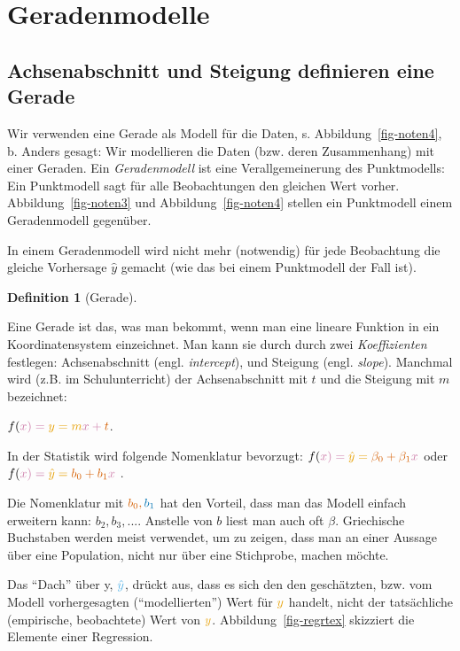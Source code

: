 \documentclass[
  letterpaper,
  twoside,
  open=any]{scrbook}
\theoremstyle{definition}
\newtheorem{definition}{Definition}[chapter]
\theoremstyle{definition}
\theoremstyle{definition}
\theoremstyle{remark}
\begin{document}
\section{Geradenmodelle}\label{geradenmodelle-1}

\subsection{Achsenabschnitt und Steigung definieren eine
Gerade}\label{achsenabschnitt-und-steigung-definieren-eine-gerade}

Wir verwenden eine Gerade als Modell für die Daten, s.
Abbildung~\ref{fig-noten4}, b. Anders gesagt: Wir modellieren die Daten
(bzw. deren Zusammenhang) mit einer Geraden. Ein \emph{Geradenmodell}
ist eine Verallgemeinerung des Punktmodells: Ein Punktmodell sagt für
alle Beobachtungen den gleichen Wert vorher. Abbildung~\ref{fig-noten3}
und Abbildung~\ref{fig-noten4} stellen ein Punktmodell einem
Geradenmodell gegenüber.

In einem Geradenmodell wird nicht mehr (notwendig) für jede Beobachtung
die gleiche Vorhersage \(\hat{y}\) gemacht (wie das bei einem
Punktmodell der Fall ist).

\begin{definition}[Gerade]\protect\hypertarget{def-gerade}{}\label{def-gerade}

Eine Gerade ist das, was man bekommt, wenn man eine lineare Funktion in
ein Koordinatensystem einzeichnet. Man kann sie durch durch zwei
\emph{Koeffizienten} festlegen: Achsenabschnitt (engl.
\emph{intercept}), und Steigung (engl. \emph{slope}). Manchmal wird
(z.B. im Schulunterricht) der Achsenabschnitt mit \(t\) und die Steigung
mit \(m\) bezeichnet:

\(f(\color{xcol}{x})=\color{ycol}{y}={m} \color{xcol}{x} + \color{beta0col}{t}\).

In der Statistik wird folgende Nomenklatur bevorzugt:
\(f(\color{xcol}{x})=\color{ycol}{\hat{y}}=\color{beta0col}{\beta_0} + {\beta_1} \color{xcol}{x}\)
oder
\(f(\color{xcol}{x})=\color{ycol}{\hat{y}}= \color{beta0col}{b_0} + {b_1} \color{xcol}{x}\)
.

Die Nomenklatur mit \(\color{beta0col}{b_0}, \color{beta1col}{b_1}\) hat
den Vorteil, dass man das Modell einfach erweitern kann:
\(b_2, b_3, ...\). Anstelle von \(b\) liest man auch oft \(\beta\).
Griechische Buchstaben werden meist verwendet, um zu zeigen, dass man an
einer Aussage über eine Population, nicht nur über eine Stichprobe,
machen möchte.

Das \enquote{Dach} über y, \(\color{modelcol}{\hat{y}}\), drückt aus,
dass es sich den den geschätzten, bzw. vom Modell vorhergesagten
(\enquote{modellierten}) Wert für \(\color{ycol}{y}\) handelt, nicht der
tatsächliche (empirische, beobachtete) Wert von \(\color{ycol}{y}\).
Abbildung~\ref{fig-regrtex} skizziert die Elemente einer Regression.

\end{definition}
\end{document}
